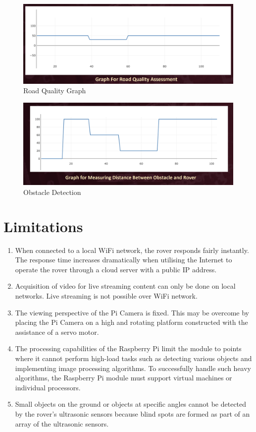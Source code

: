 \documentclass[conference,a4paper]{IEEEtran}
\begin{document}
\begin{figure}[ht]
\centering
\includegraphics[width=1\linewidth]{Shivi_Send.png}
\caption{Road Quality Graph}
\label{Fig: Road Quality}
\end{figure}

\begin{figure}[ht]
\centering
\includegraphics[width=1\linewidth]{Shivi_Send2.png}
\caption{Obstacle Detection}
\label{Fig: Detection}
\end{figure}

\section{Limitations}
\begin{enumerate}
    \item When connected to a local WiFi network, the rover responds fairly instantly. The response time increases dramatically when utilising the Internet to operate the rover through a cloud server with a public IP address.
    \item Acquisition of video for live streaming content can only be done on local networks. Live streaming is not possible over WiFi network.
    \item The viewing perspective of the Pi Camera is fixed. This may be overcome by placing the Pi Camera on a high and rotating platform constructed with the assistance of a servo motor.
    \item The processing capabilities of the Raspberry Pi limit the module to points where it cannot perform high-load tasks such as detecting various objects and implementing image processing algorithms. To successfully handle such heavy algorithms, the Raspberry Pi module must support virtual machines or individual processors.
    \item Small objects on the ground or objects at specific angles cannot be detected by the rover's ultrasonic sensors because blind spots are formed as part of an array of the ultrasonic sensors.
\end{enumerate}
\end{document}
